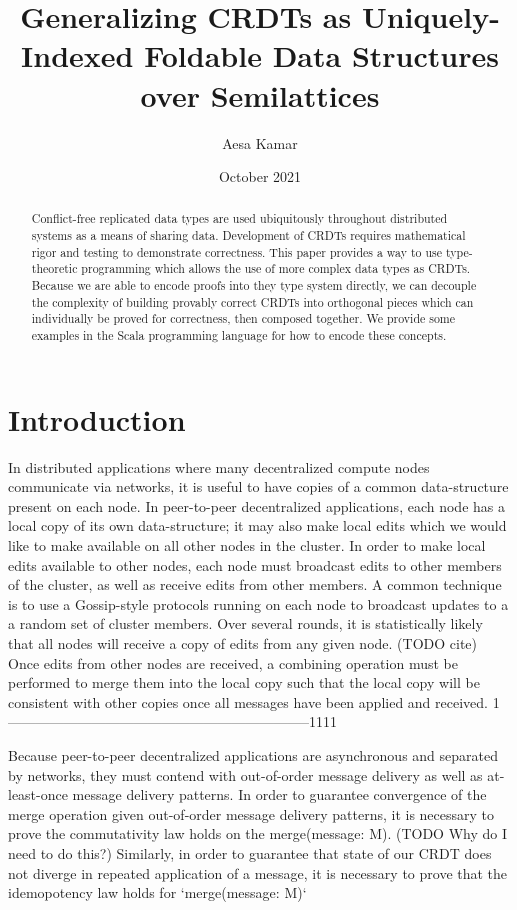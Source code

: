 \documentclass[letterpaper,10pt]{article}
\title{Generalizing CRDTs as Uniquely-Indexed Foldable Data Structures over Semilattices}
\author{Aesa Kamar}
\date{October 2021}
\begin{document}
\maketitle


\begin{abstract}

Conflict-free replicated data types are used ubiquitously throughout distributed systems as a means of sharing data. 
Development of CRDTs requires mathematical rigor and testing to demonstrate correctness. 
This paper provides a way to use type-theoretic programming which allows the use of more complex data types as CRDTs.
Because we are able to encode proofs into they type system directly, we can decouple the complexity of building provably correct CRDTs into orthogonal pieces which can individually be proved for correctness, then composed together. 
We provide some examples in the Scala programming language for how to encode these concepts.

\end{abstract}

\section{Introduction}

In distributed applications where many decentralized compute nodes communicate via networks, it is useful to have copies of a common data-structure present on each node. 
In peer-to-peer decentralized applications, each node has a local copy of its own data-structure; it may also make local edits which we would like to make available on all other nodes in the cluster.
In order to make local edits available to other nodes, each node must broadcast edits to other members of the cluster, as well as receive edits from other members. 
A common technique is to use a Gossip-style protocols running on each node to broadcast updates to a a random set of cluster members. Over several rounds, it is statistically likely that all nodes will receive a copy of edits from any given node. (TODO cite)
Once edits from other nodes are received, a combining operation must be performed to merge them into the local copy such that the local copy will be consistent with other copies once all messages have been applied and received. 1-----------------------------------------------------------------1111


Because peer-to-peer decentralized applications are asynchronous and separated by networks, they must contend with out-of-order message delivery as well as at-least-once message delivery patterns. 
In order to guarantee convergence of the merge operation given out-of-order message delivery patterns, it is necessary to prove the commutativity law holds on the merge(message: M). (TODO Why do I need to do this?)
Similarly, in order to guarantee that state of our CRDT does not diverge in repeated application of a message, it is necessary to prove that the idemopotency law holds for `merge(message: M)` 




\end{document}
